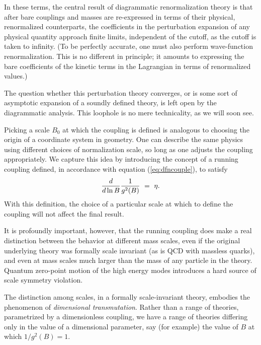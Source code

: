 \documentclass[aps,epsf]{revtex4}
\begin{document}
In these terms, the central
result of diagrammatic renormalization theory is that after bare
couplings and masses are re-expressed in terms of their physical,
renormalized counterparts, the coefficients in the perturbation
expansion of any physical quantity approach finite limits, independent
of the cutoff, as the cutoff is taken to infinity.  (To be perfectly
accurate, one must also perform wave-function renormalization.  This
is no different in principle; it amounts to expressing the bare
coefficients of the kinetic terms in the Lagrangian in terms of
renormalized values.)  

The question whether this perturbation
theory converges, or is some sort of asymptotic expansion of a soundly
defined theory, is left open by the diagrammatic analysis.  This
loophole is no mere technicality, as we will soon see.  

Picking a
scale $B_0$ at which the coupling is defined is analogous to choosing
the origin of a coordinate system in geometry.  One can describe the
same physics using different choices of normalization scale, so long
as one adjusts the coupling appropriately.  We capture this idea by
introducing the concept of a running coupling defined, in accordance with
equation (\ref{eq:dfncouple}), to satisfy
\begin{equation}{d\over d \ln B} {1\over g^2(B)} ~=~
\eta.\label{eq:running} 
\end{equation}
With this definition, the choice
of a particular scale at which to define the coupling will not affect
the final result.  

It is profoundly important, however, that the
running coupling does make a real distinction between the behavior at
different mass scales, even if the original underlying theory was
formally scale invariant (as is QCD with massless quarks), and even at
mass scales much larger than the mass of any particle in the theory.
Quantum zero-point motion of the high energy modes introduces a hard
source of scale symmetry violation.  

The distinction among scales, in
a formally scale-invariant theory, embodies the phenomenon of {\it
dimensional transmutation}.  Rather than a range of theories,
parametrized by a dimensionless coupling, we have a range of theories
differing only in the value of a dimensional parameter, say (for
example) the value of $B$ at which $1/g^2(B) = 1$.  
\end{document}
